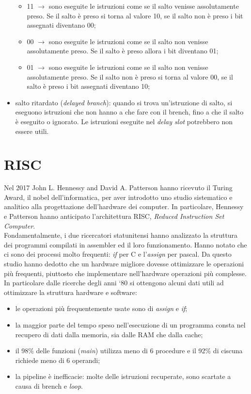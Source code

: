\documentclass{article}
\begin{document}
\begin{itemize}
\begin{itemize}
		\item 11 $\rightarrow$ sono eseguite le istruzioni come se il salto venisse assolutamente preso. Se il salto è preso si torna al valore 10, se il salto non è preso i bit assegnati diventano 00;

		\item 00 $\rightarrow$ sono eseguite le istruzioni come se il salto non venisse assolutamente preso. Se il salto è preso allora i bit diventano 01;

		\item 01 $\rightarrow$ sono eseguite le istruzioni come se il salto non venisse assolutamente preso. Se il salto non è preso si torna al valore 00, se il salto è preso i bit assegnati diventano 10;
	\end{itemize}

	\item salto ritardato (\textit{delayed branch}): quando si trova un'istruzione di salto, si eseguono istruzioni che non hanno a che fare con il brench, fino a che il salto è eseguito o ignorato. Le istruzioni eseguite nel \textit{delay slot} potrebbero non essere utili.
\end{itemize}

\section{RISC}

Nel 2017 John L. Hennessy and David A. Patterson hanno ricevuto il Turing Award, il nobel dell'informatica, per aver introdotto uno studio sistematico e analitico alla progettazione dell'hardware dei computer. In particolare, Hennessy e Patterson hanno anticipato l'architettura RISC, \textit{Reduced Instruction Set Computer}.\\ Fondamentalmente, i due ricercatori statunitensi hanno analizzato la struttura dei programmi compilati in assembler ed il loro funzionamento. Hanno notato che ci sono dei processi molto frequenti: \textit{if} per C e l'\textit{assign} per pascal. Da questo studio hanno dedotto che un hardware migliore dovesse ottimizzare le operazioni più frequenti, piuttosto che implementare nell'hardware operazioni più complesse.
In particolare dalle ricerche degli anni `80 si ottengono alcuni dati utili ad ottimizzare la struttura hardware e software:
\begin{itemize}
	\item le operazioni più frequentemente usate sono di \textit{assign} e \textit{if};

	\item la maggior parte del tempo speso nell'esecuzione di un programma consta nel recupero di dati dalla memoria, sia dalle RAM che dalla cache;

	\item il 98\% delle funzioni (\textit{main}) utilizza meno di 6 procedure e il 92\% di ciscuna richiede meno di 6 operandi;

	\item la pipeline è inefficacie: molte delle istruzioni recuperate, sono scartate a causa di brench e \textit{loop}.
\end{itemize}
\end{document}
